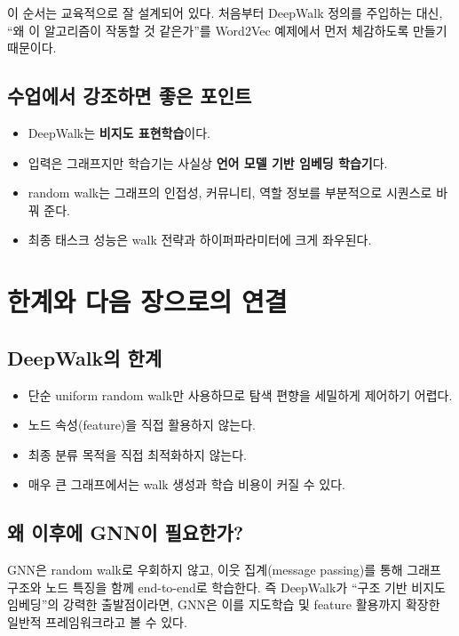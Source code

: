 \documentclass[11pt,a4paper]{article}
\begin{document}
이 순서는 교육적으로 잘 설계되어 있다. 처음부터 DeepWalk 정의를 주입하는 대신, ``왜 이 알고리즘이 작동할 것 같은가''를 Word2Vec 예제에서 먼저 체감하도록 만들기 때문이다.

\subsection{수업에서 강조하면 좋은 포인트}
\begin{itemize}[leftmargin=*]
  \item DeepWalk는 \textbf{비지도 표현학습}이다.
  \item 입력은 그래프지만 학습기는 사실상 \textbf{언어 모델 기반 임베딩 학습기}다.
  \item random walk는 그래프의 인접성, 커뮤니티, 역할 정보를 부분적으로 시퀀스로 바꿔 준다.
  \item 최종 태스크 성능은 walk 전략과 하이퍼파라미터에 크게 좌우된다.
\end{itemize}

\section{한계와 다음 장으로의 연결}

\subsection{DeepWalk의 한계}
\begin{itemize}[leftmargin=*]
  \item 단순 uniform random walk만 사용하므로 탐색 편향을 세밀하게 제어하기 어렵다.
  \item 노드 속성(feature)을 직접 활용하지 않는다.
  \item 최종 분류 목적을 직접 최적화하지 않는다.
  \item 매우 큰 그래프에서는 walk 생성과 학습 비용이 커질 수 있다.
\end{itemize}

\subsection{왜 이후에 GNN이 필요한가?}
GNN은 random walk로 우회하지 않고, 이웃 집계(message passing)를 통해 그래프 구조와 노드 특징을 함께 end-to-end로 학습한다. 즉 DeepWalk가 ``구조 기반 비지도 임베딩''의 강력한 출발점이라면, GNN은 이를 지도학습 및 feature 활용까지 확장한 일반적 프레임워크라고 볼 수 있다.
\end{document}
